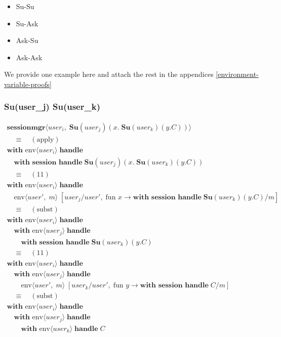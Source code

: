 \documentclass[logo,bsc,singlespacing,parskip]{infthesis}
\begin{document}
\begin{itemize}
    \item Su-Su
    \item Su-Ask
    \item Ask-Su
    \item Ask-Ask
\end{itemize}
    

We provide one example here and attach the rest in the appendices \ref{environment-variable-proofs}
\subsubsection*{Su(user\_j) Su(user\_k)}
\[
\begin{array}{l}
\textbf{sessionmgr} \langle \mathit{user}_i,\; \textbf{Su}(\mathit{user}_j)(x.\;\textbf{Su}(\mathit{user}_k)(y.C)) \rangle \\[5pt]

\quad\equiv\quad (\text{apply}) \\[5pt]
\textbf{with }\text{}\text{env} \langle \mathit{user}_i \rangle\; \textbf{handle} \\
\quad\textbf{with session handle}\; \textbf{Su}(\mathit{user}_j)(x.\;\textbf{Su}(\mathit{user}_k)(y.C)) \\[5pt]

\quad\equiv\quad (11) \\[5pt]
\textbf{with }\text{env} \langle \mathit{user}_i \rangle\; \textbf{handle} \\
\quad\textbf{}\text{env} \langle \mathit{user}',\; m \rangle\; [\mathit{user}_j/\mathit{user}',\; \text{fun } x \rightarrow \textbf{with session handle}\; \textbf{Su}(\mathit{user}_k)(y.C)/m] \\[5pt]

\quad\equiv\quad (\text{subst}) \\[5pt]
\textbf{with }\text{env} \langle \mathit{user}_i \rangle\; \textbf{handle} \\
\quad\textbf{with }\text{env} \langle \mathit{user}_j \rangle\; \textbf{handle} \\
\qquad\textbf{with session handle}\; \textbf{Su}(\mathit{user}_k)(y.C) \\[5pt]

\quad\equiv\quad (11) \\[5pt]
\textbf{with }\text{env} \langle \mathit{user}_i \rangle\; \textbf{handle} \\
\quad\textbf{with }\text{env} \langle \mathit{user}_j \rangle\; \textbf{handle} \\
\qquad\textbf{}\text{env} \langle \mathit{user}',\; m \rangle\; [\mathit{user}_k/\mathit{user}',\; \text{fun } y \rightarrow \textbf{with session handle}\; C/m] \\[5pt]

\quad\equiv\quad (\text{subst}) \\[5pt]
\textbf{with }\text{env} \langle \mathit{user}_i \rangle\; \textbf{handle} \\
\quad\textbf{with }\text{env} \langle \mathit{user}_j \rangle\; \textbf{handle} \\
\qquad\textbf{with }\text{env} \langle \mathit{user}_k \rangle\; \textbf{handle}\; C
\end{array}
\]
\end{document}
